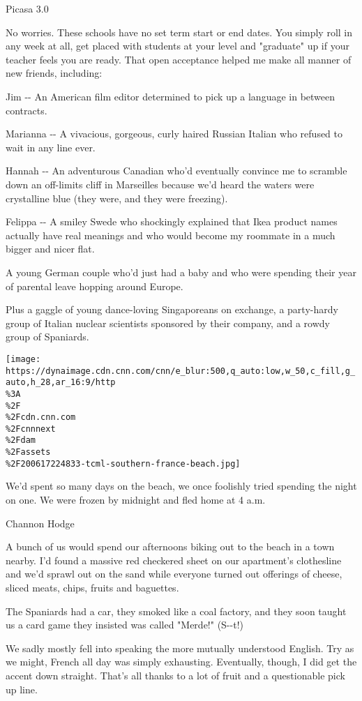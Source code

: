 Picasa 3.0

No worries. These schools have no set term start or end dates. You
simply roll in any week at all, get placed with students at your level
and "graduate" up if your teacher feels you are ready. That open
acceptance helped me make all manner of new friends, including:

Jim -\/- An American film editor determined to pick up a language in
between contracts.

Marianna -\/- A vivacious, gorgeous, curly haired Russian Italian who
refused to wait in any line ever.

Hannah -\/- An adventurous Canadian who'd eventually convince me to
scramble down an off-limits cliff in Marseilles because we'd heard the
waters were crystalline blue (they were, and they were freezing).

Felippa -\/- A smiley Swede who shockingly explained that Ikea product
names actually have real meanings and who would become my roommate in a
much bigger and nicer flat.

A young German couple who'd just had a baby and who were spending their
year of parental leave hopping around Europe.

Plus a gaggle of young dance-loving Singaporeans on exchange, a
party-hardy group of Italian nuclear scientists sponsored by their
company, and a rowdy group of Spaniards.

\href{/travel/article/trip-changed-my-life-southern-france/index.html?gallery=9}{}

\texttt{[image: https://dynaimage.cdn.cnn.com/cnn/e\_blur:500,q\_auto:low,w\_50,c\_fill,g\_auto,h\_28,ar\_16:9/http\\\%3A\\\%2F\\\%2Fcdn.cnn.com\\\%2Fcnnnext\\\%2Fdam\\\%2Fassets\\\%2F200617224833-tcml-southern-france-beach.jpg]}

We'd spent so many days on the beach, we once foolishly tried spending
the night on one. We were frozen by midnight and fled home at 4 a.m.

Channon Hodge

A bunch of us would spend our afternoons biking out to the beach in a
town nearby. I'd found a massive red checkered sheet on our apartment's
clothesline and we'd sprawl out on the sand while everyone turned out
offerings of cheese, sliced meats, chips, fruits and baguettes.

The Spaniards had a car, they smoked like a coal factory, and they soon
taught us a card game they insisted was called "Merde!" (S-\/-t!)

We sadly mostly fell into speaking the more mutually understood English.
Try as we might, French all day was simply exhausting. Eventually,
though, I did get the accent down straight. That's all thanks to a lot
of fruit and a questionable pick up line.


